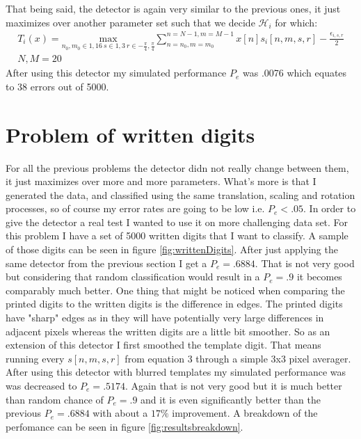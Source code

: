 \documentclass[12pt]{article}
\begin{document}
	That being said, the detector is again very similar to the previous ones, it just
		maximizes over another parameter set such that we decide $\mathcal{H}_i$ for which:
	\begin{gather}
		T_i(x) = \underset{n_0,m_0 \in 1,16 \ s \in 1,3 \ r \in -\frac{\pi}{4},\frac{\pi}{4}}{\text{max}}
		\sum_{n=n_0,m=m_0}^{n=N-1,m=M-1}
		x[n]s_i[n,m,s,r] - \frac{\epsilon_{i,s,r}}{2} \\
		N,M = 20 \nonumber
		\label{equation:loc_siz_rot}
	\end{gather}
	After using this detector my simulated performance $P_e$ was .0076 which 
		equates to 38 errors out of 5000.
\section{Problem of written digits}
	For all the previous problems the detector didn not really change between them, it just
		maximizes over more and more parameters.
	What's more is that I generated the data,	and classified using the
		same translation, scaling and rotation processes, so of
		course my error rates are going to be low i.e. $P_e < .05$.
	In order to give the detector a real test I wanted to use it on more challenging
		data set.
	For this problem I have a set of 5000 written digits that I want to classify.
	A sample of those digits can be seen in figure \ref{fig:writtenDigits}.
	After just applying the same detector from the previous section I get a $P_e = .6884$.
	That is not very good but considering that random classification would result in a 
		$P_e = .9$ it becomes comparably much better.
	One thing that might be noticed when comparing the printed digits to the written
		digits is the difference in edges.
	The printed digits have "sharp" edges as in they will have potentially very large
		differences in adjacent pixels whereas the written digits are a little bit smoother.
	So as an extension of this detector I first smoothed the template digit.
	That means running every $s[n,m,s,r]$ from equation %
		3 through a simple 3x3 pixel averager.
	After using this detector with blurred templates my simulated performance was 
		was decreased to $P_e =.5174$.
	Again that is not very good but it is much better than random chance of $P_e = .9$ and
		it is even significantly better than the previous $P_e = .6884$ with about a $17\%$
		improvement.
	A breakdown of the perfomance can be seen in figure \ref{fig:resultsbreakdown}.
\end{document}
